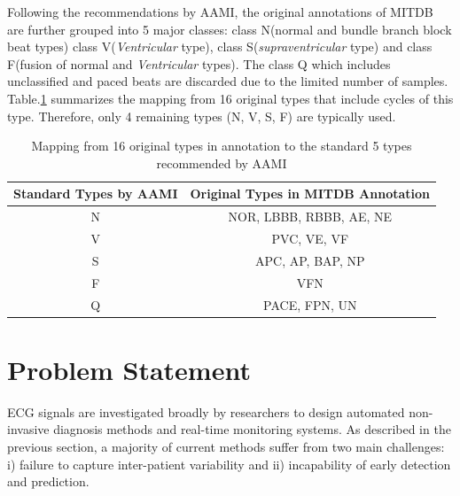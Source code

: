 Following the recommendations by AAMI, the original annotations of MITDB are further grouped into 5 major classes: class N(normal and bundle branch block beat types) class V(\textit{Ventricular} type), class S(\textit{supraventricular} type) and class F(fusion of normal and \textit{Ventricular} types). The class Q which includes unclassified and paced beats are discarded due to the limited number of samples. Table.\ref{table:grouping_types} summarizes the mapping from 16 original types that include cycles of this type. Therefore, only 4 remaining types (N, V, S, F) are typically used.%

\begin{table}[h]
\centering
\caption{Mapping from 16 original types in annotation to the standard 5 types recommended by AAMI}
\label{table:grouping_types}
\begin{tabular}{|c|c|}
\hline
Standard Types by AAMI & Original Types in MITDB Annotation \\ \hline
N                      & NOR, LBBB, RBBB, AE, NE            \\ \hline
V                      & PVC, VE, VF                        \\ \hline
S                      & APC, AP, BAP, NP                   \\ \hline
F                      & VFN                                \\ \hline
Q                      & PACE, FPN, UN                      \\ \hline
\end{tabular}
\end{table}




\section{Problem Statement}

ECG signals are investigated broadly by researchers to design automated non-invasive diagnosis methods and real-time monitoring systems\cite{Kiranyaz, chen2018predictive, jchen}. As described in the previous section, a majority of current methods suffer from two main challenges: i) failure to capture inter-patient variability and ii) incapability of early detection and prediction. %

